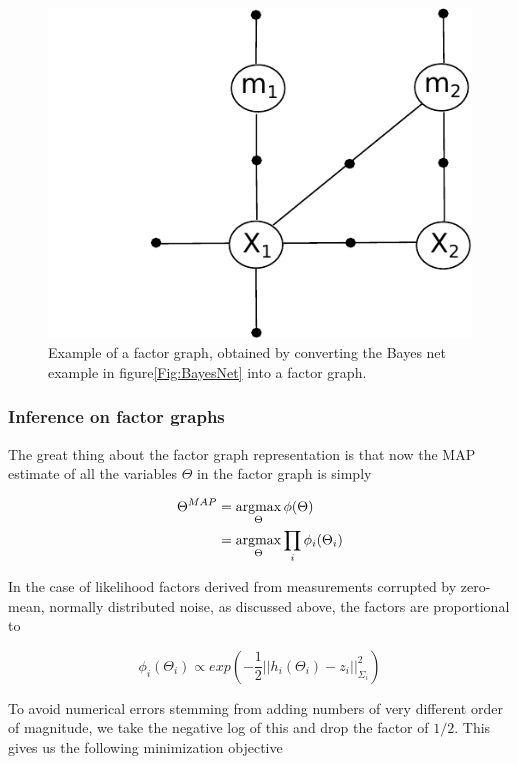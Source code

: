 \begin{figure}
    \centering
    \includegraphics[width=0.8\linewidth]{0_Images/3_Background/FactorGraph.pdf}
    \caption[Example of a Bayes net.]
    {Example of a factor graph, obtained by converting the Bayes net example in figure\ref{Fig:BayesNet} into a factor graph.}
    \label{Fig:FactorGraph}
\end{figure}

\subsubsection{Inference on factor graphs}

The great thing about the factor graph representation is that now the MAP estimate of all the variables $\Theta$ in the factor graph is simply

\begin{align}
    \Theta^{MAP} &= \operatorname*{argmax}_{\Theta} \phi(\Theta) \\
    &= \operatorname*{argmax}_{\Theta}\prod_i \phi_i(\Theta_i)
\end{align}

In the case of likelihood factors derived from measurements corrupted by zero-mean, normally distributed noise, as discussed above, the factors are proportional to

\begin{equation}
    \phi_i(\Theta_i) \propto exp(-\frac{1}{2}||h_i(\Theta_i) - z_i||_{\Sigma_i}^2)
\end{equation}

To avoid numerical errors stemming from adding numbers of very different order of magnitude, we take the negative log of this and drop the factor of $1/2$. This gives us the following minimization objective

